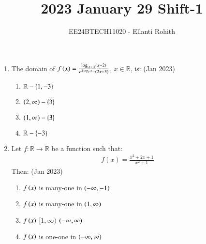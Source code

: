 \documentclass[journal,12pt,onecolumn]{IEEEtran}
\theoremstyle{remark}
\begin{document}

\vspace{3cm}

\title{2023 January 29 Shift-1}
\author{EE24BTECH11020 -  Ellanti Rohith}
\maketitle

\renewcommand{\thefigure}{\theenumi}
\renewcommand{\thetable}{\theenumi}

\begin{enumerate}

\item The domain of $f\left(x\right) = \frac{\log_{(x+1)}(x-2)}{e^{2 \log_e x} - (2x + 3)} $, $ x \in \mathbb{R} $, is: \hfill(Jan 2023)
\begin{multicols}{4}
    \begin{enumerate}
    \item $\mathbb{R} - \left\{1,-3\right\}$ 
    \item $\left(2,\infty\right) - \left\{3\right\}$ 
     \item $\left(1,\infty\right) - \left\{3\right\}$ 
    \item $\mathbb{R} - \left\{-3\right\}$ 
\end{enumerate}
\end{multicols}


\item Let $f:\mathbb{R} \to \mathbb{R} $ be a function such that:
   \begin{align*}
        f(x) = \frac{x^2 + 2x + 1}{x^{2} + 1}
   \end{align*}
   Then: \hfill(Jan 2023)
   \begin{enumerate}
       \item $f\left(x\right)$  is many-one in  $\left(-\infty, -1\right)$
       \item $f\left(x\right)$  is many-one in  $\left(1,\infty\right)$
       \item $f\left(x\right)$  $[1 ,\infty) $  $\left(-\infty, \infty\right)$

       
       \item $ f\left(x\right)$  is one-one in  $\left(-\infty, \infty\right)$
   \end{enumerate}


\end{enumerate}
\end{document}
